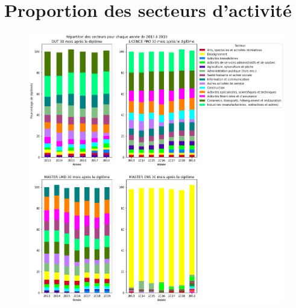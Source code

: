 \documentclass[12pt, a4paper, titlepage, table]{article}
\begin{document}
\section{Proportion des secteurs d'activité}

\begin{figure}[H]
	\centering
	\includegraphics[width=1\textwidth]{../graphs/repartition_secteurs_situation.png}
\end{figure}
\end{document}
